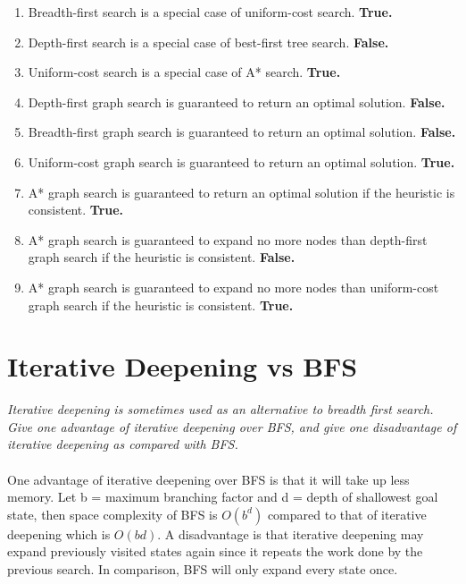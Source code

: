 \documentclass{article}
\begin{document}
\begin{enumerate}[label=(\alph*)]
\item Breadth-first search is a special case of uniform-cost search. \textbf{True.}
\item Depth-first search is a special case of best-first tree search. \textbf{False.} 
\item Uniform-cost search is a special case of A* search. \textbf{True.}
\item Depth-first graph search is guaranteed to return an optimal solution. \textbf{False.}
\item Breadth-first graph search is guaranteed to return an optimal solution. \textbf{False.}
\item Uniform-cost graph search is guaranteed to return an optimal solution. \textbf{True.}
\item A* graph search is guaranteed to return an optimal solution if the heuristic is consistent. \textbf{True.}
\item A* graph search is guaranteed to expand no more nodes than depth-first graph search if the heuristic is consistent. \textbf{False.}
\item A* graph search is guaranteed to expand no more nodes than uniform-cost graph search if the heuristic is consistent. \textbf{True.}
\end{enumerate}

\section{Iterative Deepening vs BFS}
\textit{Iterative deepening is sometimes used as an alternative to breadth first search.  Give one advantage of iterative deepening over BFS, and give one disadvantage of iterative deepening as compared with BFS.}
\\\\
One advantage of iterative deepening over BFS is that it will take up less memory. Let b = maximum branching factor and d = depth of shallowest goal state, then space complexity of BFS is $O(b^d)$ compared to that of iterative deepening which is $O(bd)$. A disadvantage is that iterative deepening may expand previously visited states again since it repeats the work done by the previous search. In comparison, BFS will only expand every state once.
\newpage
\end{document}
